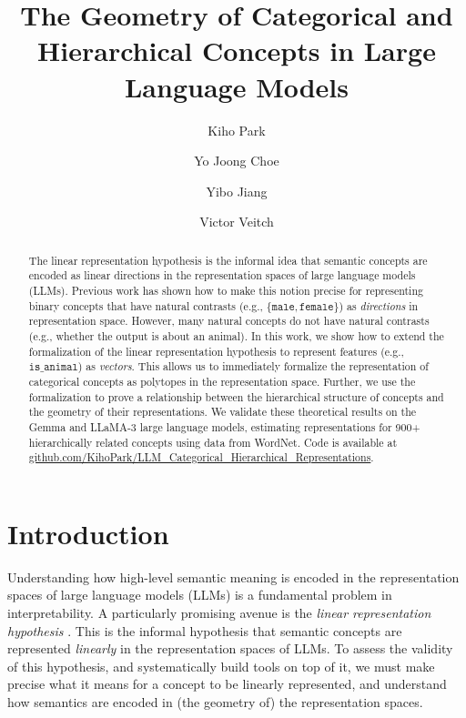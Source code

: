 \documentclass{article}
\title{The Geometry of Categorical and \\ Hierarchical Concepts in Large Language Models}
\date{}
\author[1]{Kiho Park}
\author[2]{Yo Joong Choe}
\author[3]{Yibo Jiang}
\author[1,2]{Victor Veitch}
\affil[1]{Department of Statistics, University of Chicago}
\affil[2]{Data Science Institute, University of Chicago}
\affil[3]{Department of Computer Science, University of Chicago}
\newcommand{\ConceptValue}[1]{\texttt{#1}}
\begin{document}
\maketitle

\begin{abstract}
  The linear representation hypothesis is the informal idea that semantic concepts are encoded as linear directions in the representation spaces of large language models (LLMs).
  Previous work has shown how to make this notion precise for representing binary concepts that have natural contrasts (e.g., $\{\ConceptValue{male}, \ConceptValue{female}\}$) as \emph{directions} in representation space.
  However, many natural concepts do not have natural contrasts (e.g., whether the output is about an animal). In this work, we show how to extend the formalization of the linear representation hypothesis to represent features (e.g., $\ConceptValue{is\_animal}$) as \emph{vectors}.
  This allows us to immediately formalize the representation of categorical concepts as polytopes in the representation space. Further, we use the formalization to prove a relationship between the hierarchical structure of concepts and the geometry of their representations.
  We validate these theoretical results on the Gemma and LLaMA-3 large language models, estimating representations for 900+ hierarchically related concepts using data from WordNet.
  Code is available at \href{https://github.com/KihoPark/LLM_Categorical_Hierarchical_Representations}{github.com/KihoPark/LLM\_Categorical\_Hierarchical\_Representations}.
\end{abstract}

\section{Introduction}\label{sec:introduction}
Understanding how high-level semantic meaning is encoded in the representation spaces of large language models (LLMs) is a fundamental problem in interpretability.
A particularly promising avenue is the \emph{linear representation hypothesis} \citep[e.g.,][]{mikolov2013linguistic, elhage2022toy, nanda2023emergent, gurnee2024language, park2024linear}.
This is the informal hypothesis that semantic concepts are represented \emph{linearly} in the representation spaces of LLMs.
To assess the validity of this hypothesis, and systematically build tools on top of it, we must make precise what it means for a concept to be linearly represented, and understand how semantics are encoded in (the geometry of) the representation spaces.
\end{document}

